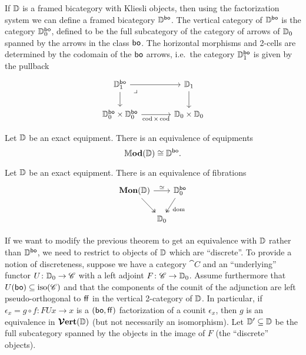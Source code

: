 \documentclass[12pt,oneside,article,draft]{memoir}
\begin{document}
If $\mathbb{D}$ is a framed bicategory with Kliesli objects, then using the factorization system we
can define a framed bicategory $\mathbb{D}^{\mathsf{bo}}$.  The vertical category of $\mathbb{D}^{\mathsf{bo}}$ is the
category $\mathbb{D}_0^{\mathsf{bo}}$, defined to be the full subcategory of the category of arrows of
$\mathbb{D}_0$ spanned by the arrows in the class $\mathsf{bo}$.  The horizontal morphisms and 2-cells are
determined by the codomain of the $\mathsf{bo}$ arrows, i.e.~the category $\mathbb{D}_1^{\mathsf{bo}}$ is given by the
pullback
\[
\begin{tikzcd}[column sep=large]
   \dcat{D}_1^{\bo} \ar[r] \ar[d] \ar[dr,phantom,"\lrcorner" very near start]
      & \dcat{D}_1 \ar[d] \\
   \dcat{D}_0^{\bo}\times\dcat{D}_0^{\bo} \ar[r,"\cod\times\cod"']
      & \dcat{D}_0\times\dcat{D}_0
\end{tikzcd}
\]

\begin{theorem}\label{thm:Mod vs bo}
   Let $\mathbb{D}$ be an exact equipment. There is an equivalence of equipments
   \[
      \mathbb{M}\mathbf{od}(\mathbb{D}) \cong \mathbb{D}^{\mathsf{bo}}.
   \]
\end{theorem}

\begin{corollary}
   Let $\mathbb{D}$ be an exact equipment. There is an equivalence of fibrations
   \begin{equation*}
      \begin{tikzcd}[column sep=0em]
         \Mon(\dcat{D}) \ar[rr,"\equiv"] \ar[dr,two heads]
            && \dcat{D}_0^{\bo} \ar[dl,two heads,"\dom"] \\
         & \dcat{D}_0 &
      \end{tikzcd}
   \end{equation*}
\end{corollary}

If we want to modify the previous theorem to get an equivalence with $\mathbb{D}$ rather than
$\mathbb{D}^{\mathsf{bo}}$, we need to restrict to objects of $\mathbb{D}$ which are ``discrete''.  To provide a
notion of discreteness, suppose we have a category $\cat{C}$ and an ``underlying'' functor
$U\colon\mathbb{D}_0\to\mathscr{C}$ with a left adjoint $F\colon\mathscr{C}\to\mathbb{D}_0$.  Assume furthermore
that $U(\mathsf{bo})\subseteq\mathrm{iso}(\mathscr{C})$ and that the components of the counit of the adjunction
are left pseudo-orthogonal to $\mathsf{ff}$ in the vertical 2-category of $\mathbb{D}$.  In particular, if
$\epsilon_x=g\circ f\colon FUx\to x$ is a $(\mathsf{bo},\mathsf{ff})$ factorization of a counit $\epsilon_x$, then
$g$ is an equivalence in $\bm{\mathcal{V}}\mathbf{ert}(\mathbb{D})$ (but not necessarily an isomorphism).  Let
$\mathbb{D}'\subseteq\mathbb{D}$ be the full subcategory spanned by the objects in the image of $F$ (the
``discrete'' objects).
\end{document}
